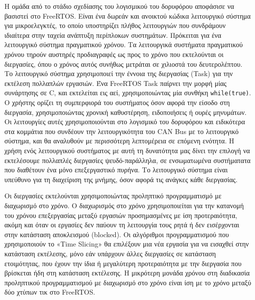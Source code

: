 \documentclass[a4paper,nobib,justified]{tufte-book}
\begin{document}
\par Η ομάδα από το στάδιο σχεδίασης του λογισμικού του δορυφόρου αποφάσισε να βασιστεί στο FreeRTOS. Είναι ένα δωρεάν και ανοικτού κώδικα λειτουργικό σύστημα για μικροελεγκτές, το οποίο υποστηρίζει πλήθος λειτουργιών που συνδράμουν ιδιαίτερα στην ταχεία ανάπτυξη περίπλοκων συστημάτων. Πρόκειται για ένα λειτουργικό σύστημα πραγματικού χρόνου. Τα λειτουργικά συστήματα πραγματικού χρόνου τηρούν αυστηρές προδιαγραφές ως προς το χρόνο που εκτελούνται οι διεργασίες, όπου ο χρόνος αυτός συνήθως μετράται σε χιλιοστά του δευτερολέπτου. Το λειτουργικό σύστημα χρησιμοποιεί την έννοια της διεργασίας (Task) για την εκτέλεση πολλαπλών εργασιών. Ένα FreeRTOS Task παίρνει την μορφή μίας συνάρτησης σε C, και εκτελείται εις αεί, χρησιμοποιώντας μία συνθήκη \texttt{while(true)}. Ο χρήστης ορίζει τη συμπερφιορά του συστήματος όσον αφορά την είσοδο στη διεργασία, χρησιμοποιώντας χρονική καθυστέρηση, ειδοποιήσεις ή ουρές μηνυμάτων. Οι λειτουργίες αυτές χρησιμοποιούνται στο λογισμικό του δορυφόρου και ειδικότερα στα κομμάτια που συνδέουν την λειτουργικότητα του CAN Bus με το λειτουργικό σύστημα, και θα αναλυθούν με περισσότερη λεπτομέρεια σε επόμενη ενότητα. Η χρήση ενός λειτουργικού συστήματος με αυτή τη δυνατότητα μας δίνει την επιλογή να εκτελέσουμε πολλαπλές διεργασίες ψευδό-παράλληλα, σε ενσωματωμένα συστήματατα που διαθέτουν ένα μόνο επεξεργαστικό πυρήνα. Το λειτουργικό σύστημα είναι υπεύθυνο για τη διαχείριση της μνήμης, όσον αφορά τις ανάγκες κάθε διεργασίας.

Οι διεργασίες εκτελούνται χρησιμοποιώντας προληπτικό προγραμματισμό με διαχωρισμό στο χρόνο. Ο διαχωρισμός στο χρόνο χρησιμοποιείται για την κατανομή του χρόνου επεξεργασίας μεταξύ εργασιών προσημασμένες με ίση προτεραιότητα, ακόμη και όταν οι εργασίες δεν παύουν τη λειτουργία τους ρητά ή δεν εισέρχονται στην κατάσταση αποκλεισμού (blocked). Οι αλγόριθμοι προγραμματισμού που χρησιμοποιούν το «Time Slicing» θα επιλέξουν μια νέα εργασία για να εισαχθεί στην κατάσταση εκτέλεσης, μόνο εάν υπάρχουν άλλες διεργασίες σε κατάσταση ετοιμότητας, που έχουν την ίδια ή μεγαλύτερη προτεραιότητα με την διεργασία που βρίσκεται ήδη στη κατάσταση εκτέλεσης. Η μικρότερη μονάδα χρόνου στη διαδικασία προληπτικού προγραμματισμού με διαχωρισμό στο χρόνο είναι ίση με το χρόνο μεταξύ δύο χτύπων τικ στο FreeRTOS.
\end{document}
